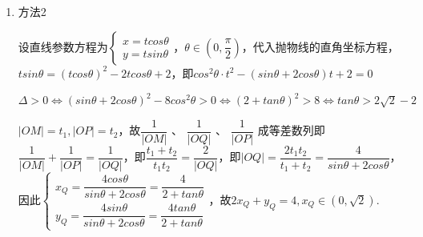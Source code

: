 \begin{enumerate}
\begin{jieda}
\begin{enumerate}
            假设在 ${MP}$ 上存在动点 $Q$ ,使 $\dfrac{1}{\left| OM\right| }$ 、 $\dfrac{1}{\left| OQ\right| }$ 、
            $\dfrac{1}{\left| OP\right| }$ 成等差数列,
            则 $\dfrac{1}{\left| OM\right| } + \dfrac{1}{\left| OP\right| } = \dfrac{2}{\left| OQ\right| }$ ,即
            $\dfrac{\left| OQ\right| }{\left| OM\right| } + \dfrac{\left| OQ\right| }{\left| OP\right| } = 2$
            
            $\therefore \dfrac{x}{{x}_{1}} + \dfrac{x}{{x}_{2}} = 2$ ,化为：
            $x = \dfrac{2{x}_{1}{x}_{2}}{{x}_{1} + {x}_{2}} = \dfrac{2 \times  2}{2 + k} = \dfrac{4}{2 + k}.$
            $\therefore y = {kx} = \dfrac{4k}{2 + k}$ ,
            消去 $k$ 可得： ${2x} + y - 4 = 0$ .
            因此在 ${MP}$ 上存在动点 $Q$ ,使 $\dfrac{1}{\left| OM\right| }$ 、 $\dfrac{1}{\left| OQ\right| }$ 、
            $\dfrac{1}{\left| OP\right| }$ 成等差数列,点 $Q$ 的轨迹方程为：${2x} + y - 4 = 0(x \in(0,\sqrt{2})).$

            \item 方法2

            设直线参数方程为$\left\{\begin{array}{l}
                 x = tcos\theta  \\
                 y = tsin\theta
            \end{array}\right.$，$ \theta \in \left(0, \dfrac{\pi}{2}\right)$，代入抛物线的直角坐标方程，$tsin\theta = (tcos\theta)^2-2tcos\theta+2$，即$cos^2\theta \cdot t^2 - (sin\theta + 2cos\theta) t + 2 = 0$

            $\Delta > 0 \Longleftrightarrow (sin\theta + 2cos\theta)^2-8cos^2\theta > 0 \Longleftrightarrow (2+tan\theta)^2>8 \Longleftrightarrow tan\theta > 2\sqrt{2}-2$

            $|OM| = t_1, |OP| = t_2$，故$\dfrac{1}{\left| OM\right| }\text{ 、 }\dfrac{1}{\left| OQ\right| }\text{ 、 }\dfrac{1}{\left| OP\right| }$ 成等差数列即$\dfrac{1}{|OM|} + \dfrac{1}{|OP|} = \dfrac{1}{|OQ|}$，即$\dfrac{t_1+t_2}{t_1t_2} = \dfrac{2}{|OQ|}$，即$|OQ| = \dfrac{2t_1t_2}{t_1+t_2} = \dfrac{4}{sin\theta+2cos\theta}$，因此$\left\{\begin{array}{l}
                 x_Q = \dfrac{4cos\theta}{sin\theta+2cos\theta} = \dfrac{4}{2+tan\theta}  \\
                 y_Q = \dfrac{4sin\theta}{sin\theta+2cos\theta} = \dfrac{4tan\theta}{2+tan\theta} 
            \end{array}\right.$，故$2x_Q+y_Q = 4, x_Q \in (0, \sqrt{2})$.


\end{enumerate}
\end{jieda}
\end{enumerate}

